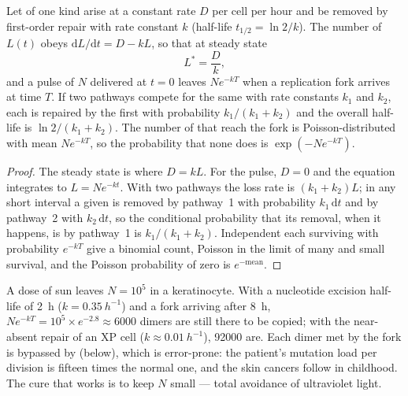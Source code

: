 \begin{theorem}\label{thm:b3:dna-repair:load}
Let  of one kind arise at a constant rate $D$ per cell per
hour and be removed by first-order repair with rate constant $k$
(half-life $t_{1/2} = \ln 2/k$). The number of  $L(t)$ obeys
$\mathrm{d}L/\mathrm{d}t = D - kL$, so that at steady state
\[
L^{*} = \frac{D}{k},
\]
and a pulse of $N$  delivered at $t = 0$ leaves $N e^{-kT}$
 when a replication fork arrives at time $T$. If two pathways
compete for the same  with rate constants $k_{1}$ and $k_{2}$,
each  is repaired by the first with probability $k_{1}/(k_{1} +
k_{2})$ and the overall half-life is $\ln 2/(k_{1} + k_{2})$. The
number of  that reach the fork is Poisson-distributed with mean
$N e^{-kT}$, so the probability that none does is $\exp(-N e^{-kT})$.
\end{theorem}
\begin{proof}
The steady state is where $D = kL$. For the pulse, $D = 0$ and the
equation integrates to $L = N e^{-kt}$. With two pathways the loss
rate is $(k_{1} + k_{2})L$; in any short interval a given  is
removed by pathway~1 with probability $k_{1}\,\mathrm{d}t$ and by
pathway~2 with $k_{2}\,\mathrm{d}t$, so the conditional probability
that its removal, when it happens, is by pathway~1 is $k_{1}/(k_{1} +
k_{2})$. Independent  each surviving with probability $e^{-kT}$
give a binomial count, Poisson in the limit of many  and small
survival, and the Poisson probability of zero is $e^{-\text{mean}}$.
\end{proof}

\begin{example}\label{ex:b3:dna-repair:xp}
A dose of sun leaves $N = 10^{5}$  in a keratinocyte.
With a nucleotide excision half-life of \qty{2}{h} ($k =
\qty{0.35}{h^{-1}}$) and a fork arriving after \qty{8}{h}, $N e^{-kT} =
10^{5}\times e^{-2.8} \approx 6000$ dimers are still there to be
copied; with the near-absent repair of an XP cell ($k \approx
\qty{0.01}{h^{-1}}$), \num{92000} are. Each dimer met by the fork is
bypassed by  (below), which is error-prone: the
patient's mutation load per division is fifteen times the normal one,
and the skin cancers follow in childhood. The cure that works is to
keep $N$ small --- total avoidance of ultraviolet light.
\end{example}


